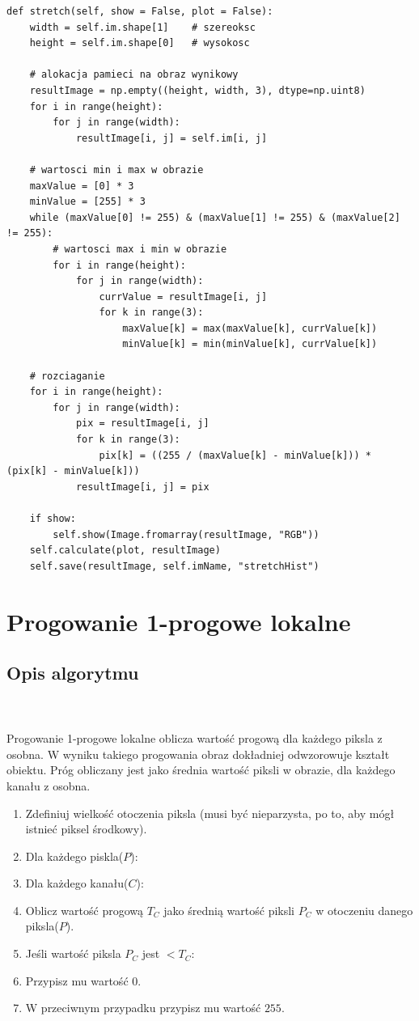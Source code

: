 \documentclass[final,a4paper,openany,12pt]{mwbk}
\begin{document}

\begin{lstlisting}[caption=Rozciąganie histogramu]
def stretch(self, show = False, plot = False):
	width = self.im.shape[1]    # szereoksc
	height = self.im.shape[0]   # wysokosc
	
	# alokacja pamieci na obraz wynikowy
	resultImage = np.empty((height, width, 3), dtype=np.uint8)
	for i in range(height):
		for j in range(width):
			resultImage[i, j] = self.im[i, j]
	
	# wartosci min i max w obrazie
	maxValue = [0] * 3
	minValue = [255] * 3
	while (maxValue[0] != 255) & (maxValue[1] != 255) & (maxValue[2] != 255):
		# wartosci max i min w obrazie
		for i in range(height):
			for j in range(width):
				currValue = resultImage[i, j]
				for k in range(3):
					maxValue[k] = max(maxValue[k], currValue[k])
					minValue[k] = min(minValue[k], currValue[k])
	
	# rozciaganie
	for i in range(height):
		for j in range(width):
			pix = resultImage[i, j]
			for k in range(3):
				pix[k] = ((255 / (maxValue[k] - minValue[k])) * (pix[k] - minValue[k]))
			resultImage[i, j] = pix
	
	if show:
		self.show(Image.fromarray(resultImage, "RGB"))
	self.calculate(plot, resultImage)
	self.save(resultImage, self.imName, "stretchHist")
\end{lstlisting}

\newpage



\section{Progowanie 1-progowe lokalne}
\subsection*{Opis algorytmu}
\hfill
\\\\
\indent Progowanie 1-progowe lokalne oblicza wartość progową dla każdego piksla z osobna. W wyniku takiego progowania obraz dokładniej odwzorowuje kształt obiektu. Próg obliczany jest jako średnia wartość piksli w obrazie, dla każdego kanału z osobna.
\begin{enumerate}
	\item Zdefiniuj wielkość otoczenia piksla (musi być nieparzysta, po to, aby mógł istnieć piksel środkowy).
	\item Dla każdego piskla($P$):
	\item Dla każdego kanału($C$):
	\item Oblicz wartość progową $T_C$ jako średnią wartość piksli $P_C$ w otoczeniu danego piksla($P$).
	\item Jeśli wartość piksla $P_C$ jest $< T_C$:
	\item Przypisz mu wartość $0$.
	\item W przeciwnym przypadku przypisz mu wartość $255$.
\end{enumerate}
\end{document}
